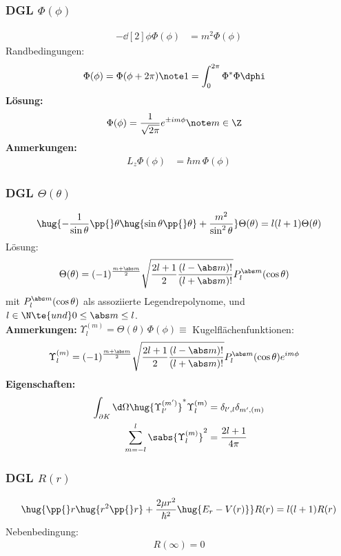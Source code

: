 \documentclass[twocolumn]{summery_4.1}
\begin{document}
\subsubsection{DGL $\Phi(\phi)$}
\begin{align*}
    - \dd[2]{}\phi \Phi(\phi) &= m^2 \Phi(\phi)
\end{align*}
Randbedingungen:
\begin{align*}
    \Phi(\phi) &= \Phi(\phi+2\pi)\note 1 = \int_0^{2\pi} \Phi^* \Phi \dphi
\end{align*}
\textbf{Lösung:}
\begin{align*}
    \Phi(\phi) &= \frac{1}{\sqrt{2\pi}} e^{\pm i m \phi}\note m\in \Z 
\end{align*}
\textbf{Anmerkungen:}
\begin{align*}
    L_z \Phi(\phi) &= \hbar m\, \Phi(\phi)
\end{align*}

\subsubsection{DGL $\Theta(\theta)$}
\begin{align*}
    \hug{-\frac{1}{\sin\theta}\pp{}\theta \hug{\sin\theta\pp{}\theta}  + \frac{m^2}{\sin^2\theta}}\Theta(\theta) =  l(l+1)\Theta(\theta)
\end{align*}
Lösung:
\begin{align*}
    \Theta(\theta) &= (-1)^{\frac{m+\abs m}{2}} \sqrt{\frac{2l +1}{2} \frac{(l - \abs m)!}{(l+\abs m)!}} P_l^{\abs m}(\cos\theta) 
\end{align*}
mit \( P_l^{\abs m}(\cos\theta)\) als assoziierte Legendrepolynome, und \( l\in \N\te{ und } 0 \le \abs m \le l\).\\

\textbf{Anmerkungen:} \(\Upsilon_{l}^{(m)}=\Theta(\theta)\,\Phi(\phi) \equiv\) Kugelflächenfunktionen:
\begin{align*}
    \Upsilon_l^{(m)} &=  (-1)^{\frac{m+\abs m}{2}} \sqrt{\frac{2l +1}{2} \frac{(l - \abs m)!}{(l+\abs m)!}} P_l^{\abs m}(\cos\theta) e^{im\phi}
\end{align*}
\textbf{Eigenschaften:}
\begin{align*}
    \int_{\partial K} \d\Omega \hug{\Upsilon_{l'}^{(m')}}^* \Upsilon_{l}^{(m)} &= \delta_{l',l} \delta_{m',(m)} \\
    \sum_{m=-l}^l \sabs{\Upsilon_{l}^{(m)}}^2 &= \frac{2l + 1}{4\pi}
\end{align*}

\subsubsection{DGL $R(r)$}
\begin{align*}
    \hug{\pp{}r \hug{r^2\pp{}r} + \frac{2\mu r^2}{\hbar^2} \hug{E_r - V(r)}} R(r) = l(l+1) R(r)
\end{align*}
Nebenbedingung:
\begin{align*}
    R(\infty) =0
\end{align*}
\end{document}
